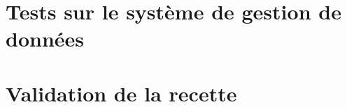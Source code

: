 \documentclass[11pt,fleqn]{report}
\begin{document}

\chapter{Tests sur le système de gestion de données}

\chapter{Validation de la recette}
\end{document}
